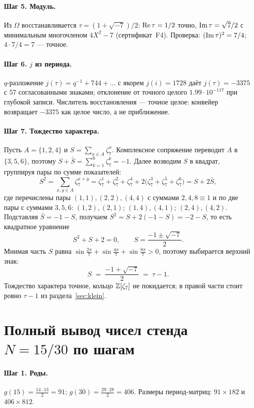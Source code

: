 \paragraph{Шаг 5. Модуль.} Из $\Omega$ восстанавливается
$\tau=(1+\sqrt{-7})/2$: $\operatorname{Re}\tau=1/2$ точно, $\operatorname{Im}\tau=\sqrt7/2$
с минимальным многочленом $4X^2-7$ (сертификат~F4). Проверка:
$(\operatorname{Im}\tau)^2=7/4$; $4\cdot7/4=7$ --- точное.

\paragraph{Шаг 6. $j$ из периода.} $q$-разложение
$j(\tau)=q^{-1}+744+\dots$ с якорем $j(i)=1728$ даёт
$j(\tau)=-3375$ с $57$ согласованными знаками; отклонение от точного
целого $1.99\cdot10^{-117}$ при глубокой записи. Числитель
восстановления --- точное целое: конвейер возвращает $-3375$ как
целое число, а не приближение.

\paragraph{Шаг 7. Тождество характера.} Пусть
$A=\{1,2,4\}$ и $S=\sum_{x\in A}\zeta_7^x$. Комплексное сопряжение
переводит $A$ в $\{3,5,6\}$, поэтому
$S+\bar S=\sum_{k=1}^{6}\zeta_7^k=-1$. Далее возводим $S$ в квадрат,
группируя пары по сумме показателей:
\[
  S^2=\sum_{x,y\in A}\zeta_7^{x+y}
  =\zeta_7^{1}+\zeta_7^{2}+\zeta_7^{4}
  +2\bigl(\zeta_7^{3}+\zeta_7^{5}+\zeta_7^{6}\bigr)
  =S+2\bar S,
\]
где перечислены пары $(1,1),(2,2),(4,4)$ с суммами $2,4,8\equiv1$
и по две пары с суммами $3,5,6$: $(1,2),(2,1)$; $(1,4),(4,1)$;
$(2,4),(4,2)$. Подставляя $\bar S=-1-S$, получаем
$S^2=S+2(-1-S)=-2-S$, то есть квадратное уравнение
\[
  S^2+S+2=0,\qquad
  S=\frac{-1\pm\sqrt{-7}}{2}.
\]
Мнимая часть $S$ равна $\sin\tfrac{2\pi}{7}+\sin\tfrac{4\pi}{7}
+\sin\tfrac{8\pi}{7}>0$, поэтому выбирается верхний знак:
\[
  S\;=\;\frac{-1+\sqrt{-7}}{2}\;=\;\tau-1 .
\]
Тождество характера точное, кольцо $\mathbb{Z}[\zeta_7]$ не покидается; в
правой части стоит ровно $\tau-1$ из раздела~\ref{sec:klein}.

\section{Полный вывод чисел стенда $N=15/30$ по шагам}\label{sec:workfermat}

\paragraph{Шаг 1. Роды.} $g(15)=\frac{14\cdot13}2=91$;
$g(30)=\frac{29\cdot28}2=406$. Размеры период-матриц:
$91\times182$ и $406\times812$.

